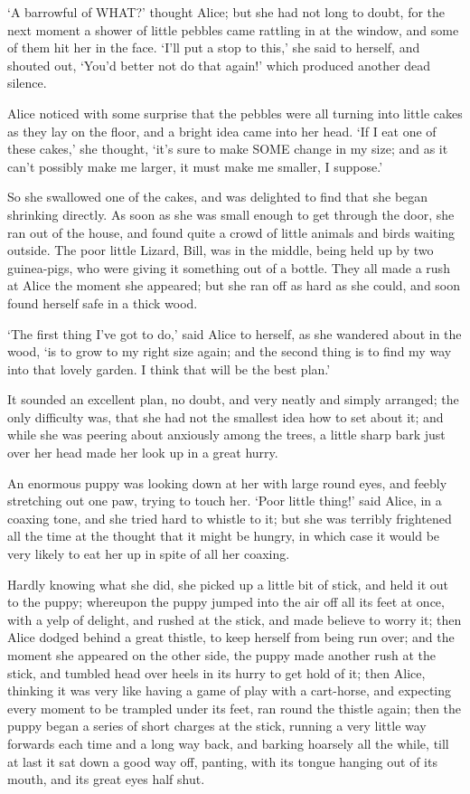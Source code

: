 \documentclass[12pt]{book}
\begin{document}
  `A barrowful of WHAT?' thought Alice; but she had not long to
doubt, for the next moment a shower of little pebbles came
rattling in at the window, and some of them hit her in the face.
`I'll put a stop to this,' she said to herself, and shouted out,
`You'd better not do that again!' which produced another dead
silence.

  Alice noticed with some surprise that the pebbles were all
turning into little cakes as they lay on the floor, and a bright
idea came into her head.  `If I eat one of these cakes,' she
thought, `it's sure to make SOME change in my size; and as it
can't possibly make me larger, it must make me smaller, I
suppose.'

  So she swallowed one of the cakes, and was delighted to find
that she began shrinking directly.  As soon as she was small
enough to get through the door, she ran out of the house, and
found quite a crowd of little animals and birds waiting outside.
The poor little Lizard, Bill, was in the middle, being held up by
two guinea-pigs, who were giving it something out of a bottle.
They all made a rush at Alice the moment she appeared; but she
ran off as hard as she could, and soon found herself safe in a
thick wood.

  `The first thing I've got to do,' said Alice to herself, as she
wandered about in the wood, `is to grow to my right size again;
and the second thing is to find my way into that lovely garden.
I think that will be the best plan.'

  It sounded an excellent plan, no doubt, and very neatly and
simply arranged; the only difficulty was, that she had not the
smallest idea how to set about it; and while she was peering
about anxiously among the trees, a little sharp bark just over
her head made her look up in a great hurry.

  An enormous puppy was looking down at her with large round
eyes, and feebly stretching out one paw, trying to touch her.
`Poor little thing!' said Alice, in a coaxing tone, and she tried
hard to whistle to it; but she was terribly frightened all the
time at the thought that it might be hungry, in which case it
would be very likely to eat her up in spite of all her coaxing.

  Hardly knowing what she did, she picked up a little bit of
stick, and held it out to the puppy; whereupon the puppy jumped
into the air off all its feet at once, with a yelp of delight,
and rushed at the stick, and made believe to worry it; then Alice
dodged behind a great thistle, to keep herself from being run
over; and the moment she appeared on the other side, the puppy
made another rush at the stick, and tumbled head over heels in
its hurry to get hold of it; then Alice, thinking it was very
like having a game of play with a cart-horse, and expecting every
moment to be trampled under its feet, ran round the thistle
again; then the puppy began a series of short charges at the
stick, running a very little way forwards each time and a long
way back, and barking hoarsely all the while, till at last it sat
down a good way off, panting, with its tongue hanging out of its
mouth, and its great eyes half shut.
\end{document}
